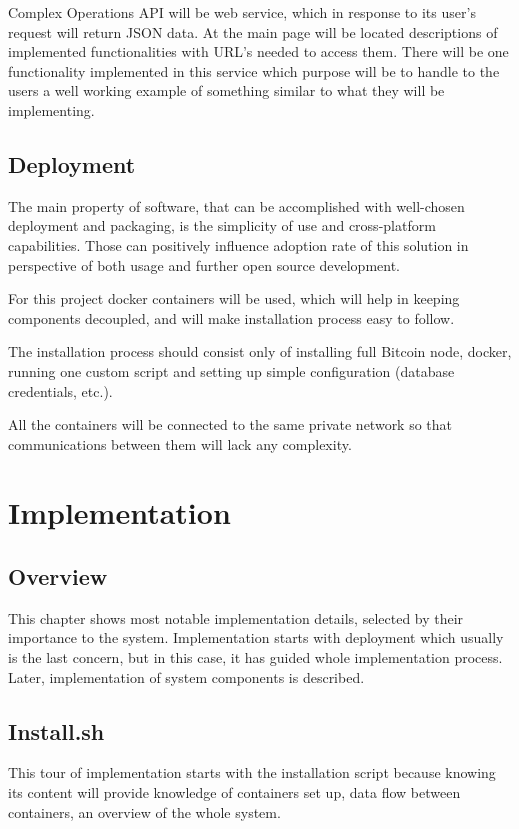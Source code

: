 \documentclass[12pt, en, eng, oneside, final]{mgr}
\begin{document}
Complex Operations API will be web service, which in response to its user's request will return JSON data. At the main page will be located descriptions of implemented functionalities with URL's needed to access them. There will be one functionality implemented in this service which purpose will be to handle to the users a well working example of something similar to what they will be implementing.   

\section{Deployment}

The main property of software, that can be accomplished with well-chosen deployment and packaging, is the simplicity of use and cross-platform capabilities. Those can positively influence adoption rate of this solution in perspective of both usage and further open source development.

For this project docker \cite{docker} containers will be used, which will help in keeping components decoupled, and will make installation process easy to follow. 

The installation process should consist only of installing full Bitcoin node, docker, running one custom script and setting up simple configuration (database credentials, etc.).

All the containers will be connected to the same private network so that communications between them will lack any complexity.

\chapter{Implementation}

\section{Overview}
This chapter shows most notable implementation details, selected by their importance to the system. Implementation starts with deployment which usually is the last concern, but in this case, it has guided whole implementation process. Later, implementation of system components is described.

\section{Install.sh}
This tour of implementation starts with the installation script because knowing its content will provide knowledge of containers set up, data flow between containers, an overview of the whole system.
\end{document}
